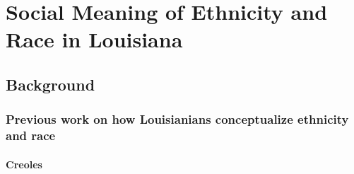 \chapter{Social Meaning of Ethnicity and Race in Louisiana}
  \section{Background}
    \subsection{Previous work on how Louisianians conceptualize ethnicity and race}
      \subsubsection{Creoles}
